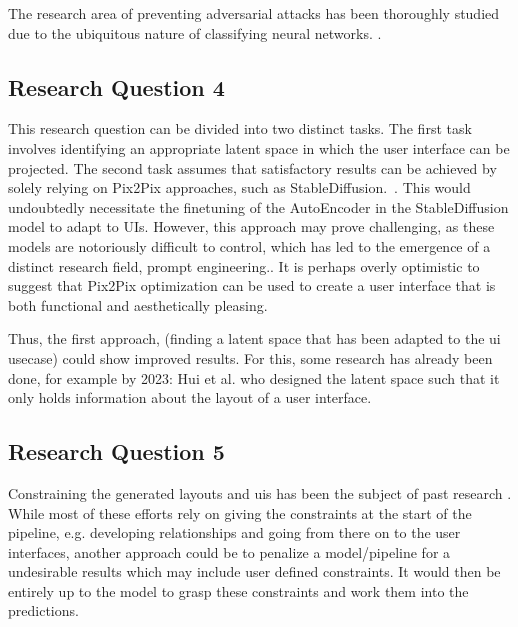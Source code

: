 \documentclass[10pt,a4paper]{scrartcl} %
\begin{document}
The research area of preventing adversarial attacks has been thoroughly studied due to the ubiquitous nature of classifying neural networks. \cite{9466420}. 


\subsection{Research Question 4}
This research question can be divided into two distinct tasks. The first task involves identifying an appropriate latent space in which the user interface can be projected. The second task assumes that satisfactory results can be achieved by solely relying on Pix2Pix approaches, such as StableDiffusion.~\cite{rombach2021highresolution}. This would undoubtedly necessitate the finetuning of the AutoEncoder in the StableDiffusion model to adapt to UIs. \cite{ruiz2023dreambooth} However, this approach may prove challenging, as these models are notoriously difficult to control, which has led to the emergence of a distinct research field, prompt engineering.. \cite{gu2023systematic} It is perhaps overly optimistic to suggest that Pix2Pix optimization can be used to create a user interface that is both functional and aesthetically pleasing.

Thus, the first approach, (finding a latent space that has been adapted to the \ac{ui} usecase) could show improved results. For this, some research has already been done, for example by 2023: Hui et al. \cite{hui2023unifying} who designed the latent space such that it only holds information about the layout of a user interface.

\subsection{Research Question 5}
Constraining the generated layouts and \ac{uis} has been the subject of past research \cite{lee2020neural}.  While most of these efforts rely on giving the constraints at the start of the pipeline, e.g. developing relationships and going from there on to the user interfaces, another approach could be to penalize a model/pipeline for a undesirable results which may include user defined constraints. It would then be entirely up to the model to grasp these constraints and work them into the predictions.
\end{document}
